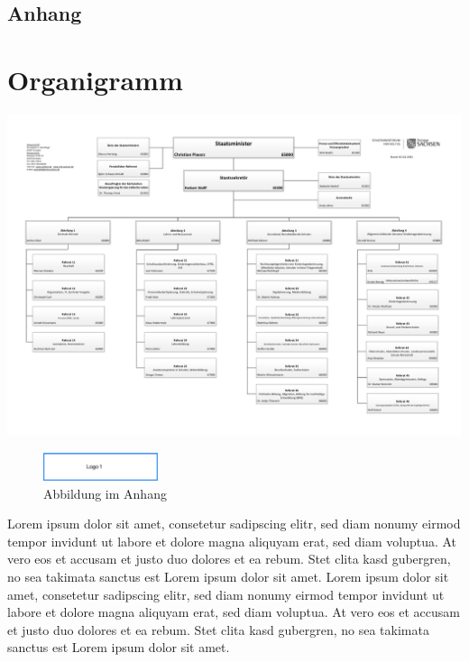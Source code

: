 \subsection*{Anhang}
\label{anhang}
\appendix
\section{Organigramm}
\label{abb:Organigramm}
\includegraphics[angle=90, page=1,height=0.90\textheight, keepaspectratio]{anhang/abb/21_01_06_Organigramm_SMK.pdf}

\begin{figure}[htb]
    \centering
    \includegraphics[width=0.3\textwidth,angle=0]{abb/logo1}
    \caption[Abbildung im Anhang]{Abbildung im Anhang}
    \label{fig:Abbildung im Anhang}
\end{figure}

Lorem ipsum dolor sit amet, consetetur sadipscing elitr, sed diam nonumy eirmod tempor invidunt ut labore et dolore magna aliquyam erat, sed diam voluptua. At vero eos et accusam et justo duo dolores et ea rebum. Stet clita kasd gubergren, no sea takimata sanctus est Lorem ipsum dolor sit amet. Lorem ipsum dolor sit amet, consetetur sadipscing elitr, sed diam nonumy eirmod tempor invidunt ut labore et dolore magna aliquyam erat, sed diam voluptua. At vero eos et accusam et justo duo dolores et ea rebum. Stet clita kasd gubergren, no sea takimata sanctus est Lorem ipsum dolor sit amet.
